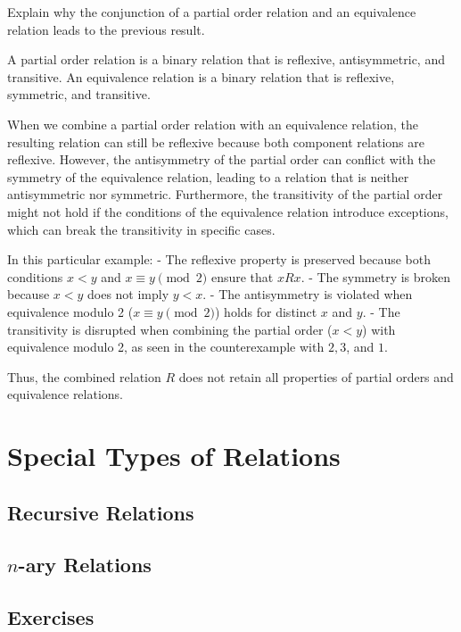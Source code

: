 \begin{exercise}
Explain why the conjunction of a partial order relation and an equivalence relation leads to the previous result.
\end{exercise}

\begin{solution}
A partial order relation is a binary relation that is reflexive, antisymmetric, and transitive. An equivalence relation is a binary relation that is reflexive, symmetric, and transitive.

When we combine a partial order relation with an equivalence relation, the resulting relation can still be reflexive because both component relations are reflexive. However, the antisymmetry of the partial order can conflict with the symmetry of the equivalence relation, leading to a relation that is neither antisymmetric nor symmetric. Furthermore, the transitivity of the partial order might not hold if the conditions of the equivalence relation introduce exceptions, which can break the transitivity in specific cases.

In this particular example:
- The reflexive property is preserved because both conditions $x < y$ and $x \equiv y \pmod{2}$ ensure that $xRx$.
- The symmetry is broken because $x < y$ does not imply $y < x$.
- The antisymmetry is violated when equivalence modulo 2 ($x \equiv y \pmod{2}$) holds for distinct $x$ and $y$.
- The transitivity is disrupted when combining the partial order ($x < y$) with equivalence modulo 2, as seen in the counterexample with $2, 3$, and $1$.

Thus, the combined relation $R$ does not retain all properties of partial orders and equivalence relations.
\end{solution}
\section{Special Types of Relations}
\subsection{Recursive Relations}
\subsection{\(n\)-ary Relations}

\subsection{Exercises}




